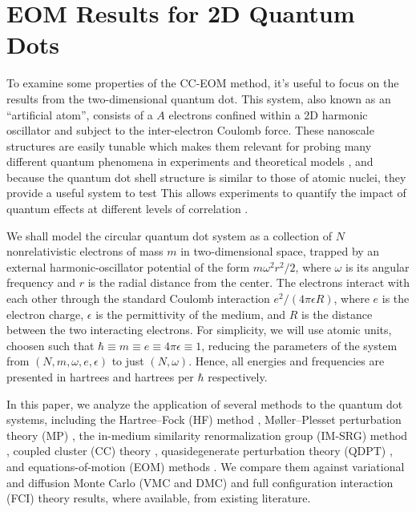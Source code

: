 \documentclass[thesis.tex]{subfiles}
\begin{document}
\section{EOM Results for 2D Quantum Dots} \label{section:eom_target_states}
To examine some properties of the CC-EOM method, it's useful to focus on the results from the two-dimensional quantum dot.  This system, also known as an ``artificial atom'', consists of a $A$ electrons confined within a 2D harmonic oscillator and subject to the inter-electron Coulomb force.  These nanoscale structures are easily tunable which makes them relevant for probing many different quantum phenomena in experiments and theoretical models \cite{reimann2002,engel1993,BIRMAN20131}, and because the quantum dot shell structure is similar to those of atomic nuclei, they provide a useful system to test This allows experiments to quantify the impact of quantum effects at different levels of correlation \cite{tarucha1996}.

We shall model the circular quantum dot system as a collection of $N$ nonrelativistic electrons of mass $m$ in two-dimensional space, trapped by an external harmonic-oscillator potential of the form $m \omega^2r^2 / 2$, where $\omega$ is its angular frequency and $r$ is the radial distance from the center.  The electrons interact with each other through the standard Coulomb interaction $e^2 / (4 \pi \epsilon R)$, where $e$ is the electron charge, $\epsilon$ is the permittivity of the medium, and $R$ is the distance between the two interacting electrons.  For simplicity, we will use atomic units, choosen such that $\hbar \equiv m \equiv e \equiv 4 \pi \epsilon \equiv 1$, reducing the parameters of the system from $(N, m, \omega, e, \epsilon)$ to just $(N, \omega)$.  Hence, all energies and frequencies are presented in hartrees and hartrees per $\hbar$ respectively.



In this paper, we analyze the application of several methods to the quantum dot systems, including the Hartree--Fock (HF) method \cite{hartree_1928,Fock1930}, M\o ller--Plesset perturbation theory (MP) \cite{1934PhRv...46..618M}, the in-medium similarity renormalization group (IM-SRG) method \cite{IMSRG}, coupled cluster (CC) theory \cite{PhysRevB.67.045320,heidari:114708,PhysRevB.84.115302}, quasidegenerate perturbation theory (QDPT) \cite{0022-3700-7-18-010,Kvasnicka1974}, and equations-of-motion (EOM) methods \cite{RevModPhys.40.153}.  We compare them against variational and diffusion Monte Carlo (VMC and DMC) \cite{PhysRevB.68.035304,PhysRevB.62.8120,PhysRevB.84.115302,PhysRevB.54.4780} and full configuration interaction (FCI) theory \cite{olsen2013thesis,JJAP.36.3924,PhysRevB.56.6428,2008arXiv0810.2644K,rontani:124102} results, where available, from existing literature.
\end{document}
